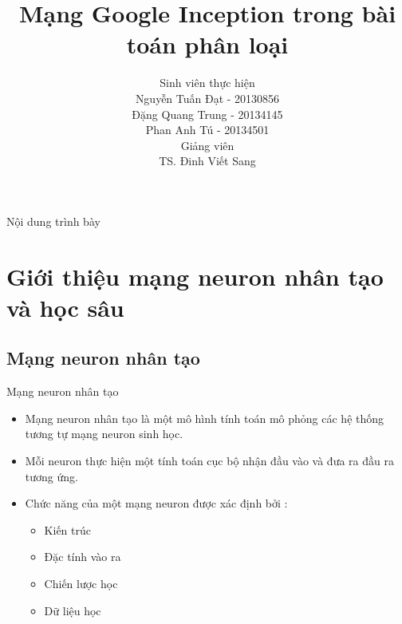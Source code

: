 \documentclass[compress]{beamer}
\title[Mạng Google Inception]{Mạng Google Inception trong bài toán phân loại}
\author[Nguyễn Tuấn Đạt, Đặng Quang Trung, Phan Anh Tú]{
Sinh viên thực hiện\\
Nguyễn Tuấn Đạt - 20130856\\
Đặng Quang Trung - 20134145\\
Phan Anh Tú - 20134501 \\[0.4cm]
Giảng viên \\
TS. Đinh Viết Sang 
}
\begin{document}
 
\begin{frame}
\titlepage
\end{frame} 
  
\begin{frame}{Nội dung trình bày}
\tableofcontents
\end{frame}
\section{Giới thiệu mạng neuron nhân tạo và học sâu}
\subsection{Mạng neuron nhân tạo}
\begin{frame}{Mạng neuron nhân tạo}
\begin{itemize}
\item Mạng neuron nhân tạo là một mô hình tính toán mô phỏng các hệ thống tương tự mạng neuron sinh học.
\item Mỗi neuron thực hiện một tính toán cục bộ nhận đầu vào và đưa ra đầu ra tương ứng.
\item  Chức năng của một  mạng neuron được xác định bởi :
\begin{itemize}
\item Kiến trúc
\item Đặc tính vào ra
\item Chiến lược học
\item Dữ liệu học 
\end{itemize}
\end{itemize}
\end{frame}
\end{document}
